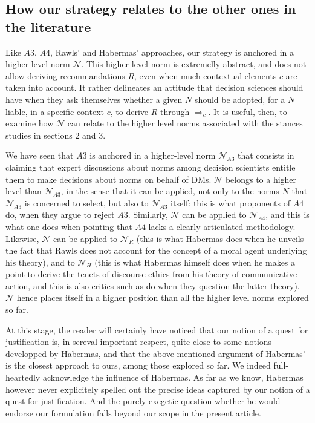 \documentclass[preprint, french, english, 11pt, authoryear]{elsarticle}%
\newcommand{\adv}{\mathscr{N}}
\begin{document}
\subsection{How our strategy relates to the other ones in the literature}
Like $A3$, $A4$, Rawls' and Habermas' approaches, our strategy is anchored in a higher level norm $\adv$. This higher level norm is extremelly abstract, and does not allow deriving recommandations $R$, even when much contextual elements $c$ are taken into account. It rather delineates an attitude that decision sciences should have when they ask themselves whether a given $N$ should be adopted, for a $N$ liable, in a specific context $c$, to derive $R$ through $⇒_c $. It is useful, then, to examine how $\adv$ can relate to the higher level norms associated with the stances studies in sections 2 and 3.

We have seen that $A3$ is anchored in a higher-level norm $\mathscr{N}_{A3}$ that consists in claiming that expert discussions about norms among decision scientists entitle them to make decisions about norms on behalf of \acp{DM}. $\adv$ belongs to a higher level than $\mathscr{N}_{A3}$, in the sense that it can be applied, not only to the norms $N$ that $\mathscr{N}_{A3}$ is concerned to select, but also to $\mathscr{N}_{A3}$ itself: this is what proponents of $A4$ do, when they argue to reject $A3$. Similarly, $\adv$ can be applied to $\mathscr{N}_{A4}$, and this is what one does when pointing that $A4$ lacks a clearly articulated methodology. Likewise, $\adv$ can be applied to $\mathscr{N}_{R}$ (this is what Habermas does when he unveils the fact that Rawls does not account for the concept of a moral agent underlying his theory), and to $\mathscr{N}_{H}$ (this is what Habermas himself does when he makes a point to derive the tenets of discourse ethics from his theory of communicative action, and this is also critics such as \citet{honneth_kritik_1985} do when they question the latter theory). $\adv$ hence places itself in a higher position than all the higher level norms explored so far.

At this stage, the reader will certainly have noticed that our notion of a quest for justification is, in sereval important respect, quite close to some notions developped by Habermas, and that the above-mentioned argument of Habermas' is the closest approach to ours, among those explored so far. We indeed full-heartedly acknowledge the influence of Habermas. As far as we know, Habermas however never explicitely spelled out the precise ideas captured by our notion of a quest for justification. And the purely exegetic question whether he would endorse our formulation falls beyond our scope in the present article. 
\end{document}
